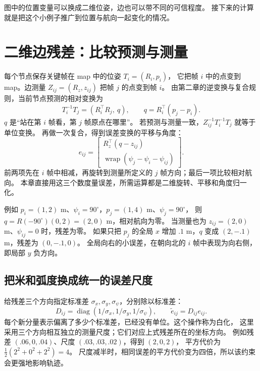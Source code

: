 \begin{center}
\end{center}
图中的位置变量可以换成二维位姿，边也可以带不同的可信程度。
接下来的计算就是把这个小例子推广到位置与航向一起变化的情况。

\section{二维边残差：比较预测与测量}
每个节点保存关键帧在 map 中的位姿 $T_i=(R_i,p_i)$，
它把帧 $i$ 中的点变到 map。边测量 $Z_{ij}=(R_z,z_{ij})$ 把帧 $j$ 的点变到帧 $i$。
由第二章的逆变换与复合规则，当前节点预测的相对变换为
\begin{equation}
T_i^{-1}T_j=(R_i^\top R_j,\ q),\qquad q=R_i^\top(p_j-p_i).
\end{equation}
$q$ 是“站在第 $i$ 帧看，第 $j$ 帧原点在哪里”。
若预测与测量一致，$Z_{ij}^{-1}T_i^{-1}T_j$ 就等于单位变换。
再做一次复合，得到误差变换的平移与角度：
\begin{equation}
e_{ij}=\begin{bmatrix}R_z^\top(q-z_{ij})\\
\operatorname{wrap}(\psi_j-\psi_i-\psi_{ij})\end{bmatrix}.
\end{equation}
前两项先在 $i$ 帧中相减，再旋转到测量所定义的 $j$ 帧方向；最后一项比较相对航向。
本章直接用这三个数度量误差，所需运算都是二维旋转、平移和角度归一化。

例如 $p_i=(1,2)$ m、$\psi_i=90^\circ$，$p_j=(1,4)$ m、$\psi_j=90^\circ$，
则 $q=R(-90^\circ)(0,2)=(2,0)$ m，相对航向为零。
当测量也为 $z_{ij}=(2,0)$ m、$\psi_{ij}=0$ 时，残差为零。
如果只把 $p_j$ 的全局 $x$ 增加 $.1$ m，$q$ 变成 $(2,-.1)$ m，残差为 $(0,-.1,0)$。
全局向右的小误差，在朝向北的 $i$ 帧中表现为向右侧，即局部 $y$ 负方向。

\subsection{把米和弧度换成统一的误差尺度}
给残差三个方向指定标准差 $\sigma_x,\sigma_y,\sigma_\psi$，分别除以标准差：
\begin{equation}
D_{ij}=\operatorname{diag}(1/\sigma_x,1/\sigma_y,1/\sigma_\psi),\qquad
\widetilde e_{ij}=D_{ij}e_{ij}.
\end{equation}
每个新分量表示偏离了多少个标准差，已经没有单位。这个操作称为白化，
这里采用三个方向相互独立的测量尺度；它们对应上式残差所在的坐标方向。
例如残差 $(.06,0,.04)$、尺度 $(.03,.03,.02)$，得到 $(2,0,2)$，
平方代价为 $\tfrac12(2^2+0^2+2^2)=4$。
尺度减半时，相同误差的平方代价变为四倍，所以该约束会更强地影响轨迹。

